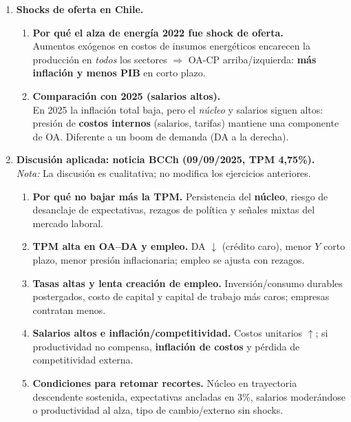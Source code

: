 \documentclass[11pt,addpoints]{article}
\begin{document}
\begin{enumerate}
\item \textbf{Shocks de oferta en Chile.}
\begin{enumerate}[label=(\alph*)]
\item \textbf{Por qué el alza de energía 2022 fue shock de oferta.} \\
Aumentos exógenos en costos de insumos energéticos encarecen la producción en \emph{todos} los sectores $\Rightarrow$ OA-CP arriba/izquierda: \textbf{más inflación y menos PIB} en corto plazo.
\item \textbf{Comparación con 2025 (salarios altos).} \\
En 2025 la inflación total baja, pero el \emph{núcleo} y salarios siguen altos: presión de \textbf{costos internos} (salarios, tarifas) mantiene una componente de OA. Diferente a un boom de demanda (DA a la derecha).
\end{enumerate}
\newpage %
\vspace*{0.1cm} %
\item \textbf{Discusión aplicada: noticia BCCh (09/09/2025, TPM 4{,}75\%).}\\
\emph{Nota:} La discusión es cualitativa; no modifica los ejercicios anteriores.
\begin{enumerate}[label=(\alph*)]
\item \textbf{Por qué no bajar más la TPM.} Persistencia del \textbf{núcleo}, riesgo de desanclaje de expectativas, rezagos de política y señales mixtas del mercado laboral.
\item \textbf{TPM alta en OA--DA y empleo.} DA $\downarrow$ (crédito caro), menor $Y$ corto plazo, menor presión inflacionaria; empleo se ajusta con rezagos.
\item \textbf{Tasas altas y lenta creación de empleo.} Inversión/consumo durables postergados, costo de capital y capital de trabajo más caros; empresas contratan menos.
\item \textbf{Salarios altos e inflación/competitividad.} Costos unitarios $\uparrow$; si productividad no compensa, \textbf{inflación de costos} y pérdida de competitividad externa.
\item \textbf{Condiciones para retomar recortes.} Núcleo en trayectoria descendente sostenida, expectativas ancladas en 3\%, salarios moderándose o productividad al alza, tipo de cambio/externo sin shocks.
\end{enumerate}

\end{enumerate}
\end{document}
